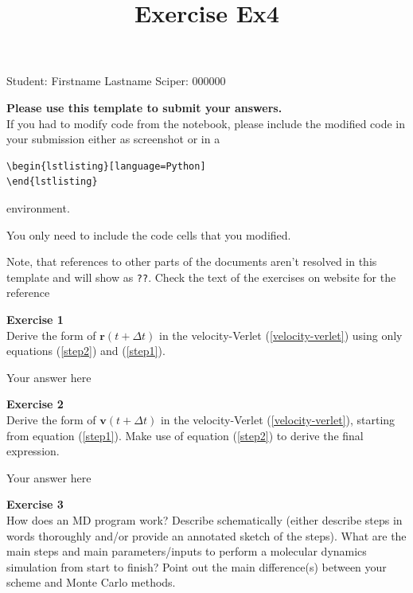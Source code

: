 \documentclass{article}
\title{Exercise Ex4}
\begin{document}
\maketitle\maketitle
\begin{center}\logo\end{center}


Student:  Firstname Lastname    Sciper: 000000

\begin{mdframed}
\textbf{Please use this template to submit your answers.}\\
If you had to modify code from the notebook, please include the modified code in your submission either as screenshot or in a

\begin{verbatim}
\begin{lstlisting}[language=Python]
\end{lstlisting}
\end{verbatim}

environment.

You only need to include the code cells that you modified.

Note, that references to other parts of the documents aren't resolved in this template and will show as \texttt{??}. Check the text of the exercises on website for the reference
\end{mdframed}

\begin{mdframed}
\textbf{Exercise 1}\\
Derive the form of $\mathbf{r}(t + \Delta t)$ in the velocity-Verlet
(\ref{velocity-verlet}) using only equations  (\ref{step2}) and (\ref{step1}).
\end{mdframed}

Your answer here

\begin{mdframed}
\textbf{Exercise 2}\\
Derive the form of $\mathbf{v}(t + \Delta t)$ in the velocity-Verlet  (\ref{velocity-verlet}), starting from equation (\ref{step1}). Make use of equation (\ref{step2}) to derive the final expression.
\end{mdframed}

Your answer here

\begin{mdframed}
\textbf{Exercise 3}\\
How does an MD program work? Describe schematically (either describe steps in words thoroughly and/or provide an annotated sketch of the steps). What are the main steps and main parameters/inputs to perform a molecular dynamics simulation from start to finish? Point out the main
difference(s) between your scheme and Monte Carlo methods.
\end{mdframed}
\end{document}

